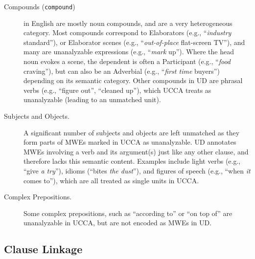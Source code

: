 \documentclass[11pt,a4paper]{article}
\newcommand{\oa}[1]{\footnote{\color{red}OA: #1}}
\begin{document}
\begin{description}
    \item[Compounds (\texttt{compound})] in English are mostly noun compounds,
        and are a very heterogeneous category.
        Most compounds correspond to Elaborators (e.g., ``\textit{industry} standard''),
        or Elaborator scenes (e.g., ``\textit{out-of-place} flat-screen TV''),
        and many are unanalyzable expressions (e.g., ``\textit{mark} up'').
        Where the head noun evokes a scene, the dependent is often a Participant
        (e.g., ``\textit{food} craving''), but can also be an Adverbial 
        (e.g., ``\textit{first time} buyers'') depending on its semantic category.
        Other compounds in UD are phrasal verbs (e.g., ``figure out'', ``cleaned up''),
        which UCCA treats as unanalyzable (leading to an unmatched unit). 
            
    \item[Subjects and Objects.]
      A significant number of subjects and objects are left unmatched as they
      form parts of MWEs marked in UCCA as unanalyzable. UD annotates
      MWEs involving a verb and its argument(s) just like any other clause, and therefore
      lacks this semantic content. Examples include light verbs (e.g., ``give {\it a try}''),
      idioms (``bites {\it the dust}''), and figures of speech (e.g., ``when \textit{it} comes to''),
      which are all treated as single units in UCCA.
      
    \item[Complex Prepositions.] Some complex prepositions, such as ``according to'' or ``on top of''
      are unanalyzable in UCCA, but are not encoded as MWEs in UD.

%     
\end{description}


\subsection{Clause Linkage}\label{sec:linkage}
\end{document}
